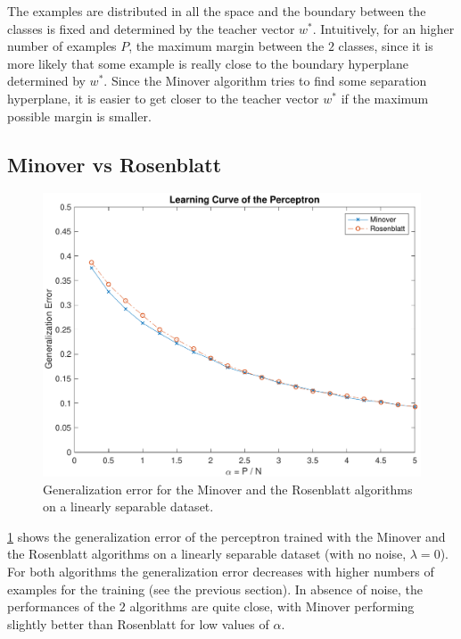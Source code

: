 The examples are distributed in all the space and the boundary between the classes is fixed and determined by the teacher vector $w^{*}$.
Intuitively, for an higher number of examples $P$, the maximum margin between the $2$ classes, since it is more likely that some example is really close to the boundary hyperplane determined by $w^{*}$.
Since the Minover algorithm tries to find some separation hyperplane, it is easier to get closer to the teacher vector $w^{*}$ if the maximum possible margin is smaller.


\subsection{Minover vs Rosenblatt}
\begin{figure}[t]
	\centering
	\includegraphics[width=\columnwidth]{figures/comparison}
    \caption{Generalization error for the Minover and the Rosenblatt algorithms on a linearly separable dataset.}
	\label{fig:comparison}
\end{figure}

\cref{fig:comparison} shows the generalization error of the perceptron trained with the Minover and the Rosenblatt algorithms on a linearly separable dataset (with no noise, $\lambda = 0$).
For both algorithms the generalization error decreases with higher numbers of examples for the training (see the previous section).
In absence of noise, the performances of the $2$ algorithms are quite close, with Minover performing slightly better than Rosenblatt for low values of $\alpha$.


